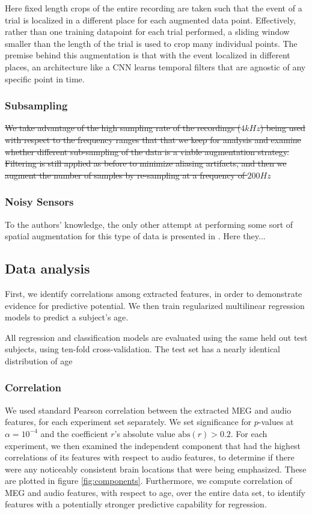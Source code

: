 \documentclass[utf8]{frontiersSCNS} %
\begin{document}
Here fixed length crops of the entire recording are taken such that the event of a trial is localized in a different place for each augmented data point. Effectively, rather than one training datapoint for each trial performed, a sliding window smaller than the length of the trial is used to crop many individual points. The premise behind this augmentation is that with the event localized in different places, an architecture like a CNN learns temporal filters that are agnostic of any specific point in time. 


\subsubsection{Subsampling}

\st{We take advantage of the high sampling rate of the recordings ($4kHz$) being used with respect to the frequency ranges that that we keep  for analysis and examine whether different sub-sampling of the data is a viable augmentation strategy. Filtering is still applied as before to minimize aliasing artifacts, and then we augment the number of samples by re-sampling at a frequency of $200 Hz$}

\subsubsection{Noisy Sensors}

To the authors' knowledge, the only other attempt at performing some sort of spatial augmentation for this type of data is presented in \cite{}. Here they...


\subsection{Data analysis}

First, we identify correlations among extracted features, in order to demonstrate evidence for predictive potential. We then train regularized multilinear regression models to predict a subject's age.

All regression and classification models are evaluated using the same held out test subjects, using ten-fold cross-validation. The test set has a nearly identical distribution of age

\subsubsection{Correlation}

We used standard Pearson correlation between the extracted MEG and audio features, for each experiment set separately. We set significance for $p$-values at $\alpha = 10^{-4}$ and the coefficient $r$'s absolute value $\text{abs}(r) > 0.2$. For each experiment, we then examined the independent component that had the highest correlations of its features with respect to audio features, to determine if there were any noticeably consistent brain locations that were being emphasized. These are plotted in figure \ref{fig:components}. Furthermore, we compute correlation of MEG and audio features, with respect to age, over the entire data set, to identify features with a potentially stronger predictive capability for regression.
\end{document}

